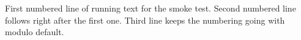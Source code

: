 \documentclass{article}
\begin{document}
First numbered line of running text for the smoke test.
Second numbered line follows right after the first one.
Third line keeps the numbering going with modulo default.
\end{document}
